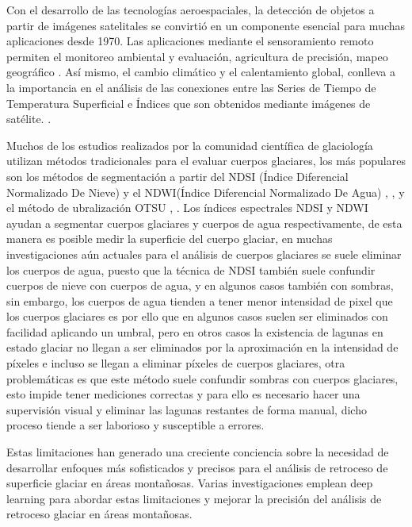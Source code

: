 Con el desarrollo de las tecnologías aeroespaciales, la detección de objetos a partir de imágenes satelitales se convirtió en un componente esencial para muchas aplicaciones desde 1970. Las aplicaciones mediante el sensoramiento remoto permiten el monitoreo ambiental y evaluación, agricultura de precisión, mapeo geográfico \parencite{sanchez2018teledeteccion}. Así mismo, el cambio climático y el calentamiento global, conlleva a la importancia en el análisis de las conexiones entre las Series de Tiempo de Temperatura Superficial e Índices que son obtenidos mediante imágenes de satélite. \parencite{zuluaga2021modelos}.


Muchos de los estudios realizados por la comunidad científica de glaciología utilizan métodos tradicionales para el evaluar cuerpos glaciares, los más populares son los métodos de segmentación a partir del NDSI (Índice Diferencial Normalizado De Nieve) y el NDWI(Índice Diferencial Normalizado De Agua) \parencite{drenkhan2018current}, \parencite{duran2015recent}, \parencite{sood2020monitoring} y el método de ubralización OTSU \parencite{garcia2022estimacion}, \parencite{gaddam2022application}. Los índices espectrales NDSI y NDWI ayudan a segmentar cuerpos glaciares y cuerpos de agua respectivamente, de esta manera es posible medir la superficie del cuerpo glaciar, en muchas investigaciones aún actuales para el análisis de cuerpos glaciares se suele eliminar los cuerpos de agua, puesto que la técnica de NDSI también suele confundir cuerpos de nieve con cuerpos de agua, y en algunos casos también con sombras, sin embargo, los cuerpos de agua tienden a tener menor intensidad de pixel que los cuerpos glaciares es por ello que en algunos casos suelen ser eliminados con facilidad aplicando un umbral, pero en otros casos la existencia de lagunas en estado glaciar no llegan a ser eliminados por la aproximación en la intensidad de píxeles e incluso se llegan a eliminar píxeles de cuerpos glaciares, otra problemáticas es que este método suele confundir sombras con cuerpos glaciares, esto impide tener mediciones correctas y para ello es necesario hacer una supervisión visual y eliminar las lagunas restantes de forma manual, dicho proceso tiende a ser laborioso y susceptible a errores.


Estas limitaciones han generado una creciente conciencia sobre la necesidad de desarrollar enfoques más sofisticados y precisos para el análisis de retroceso de superficie glaciar en áreas montañosas. Varias investigaciones emplean deep learning para abordar estas limitaciones y mejorar la precisión del análisis de retroceso glaciar en áreas montañosas.

